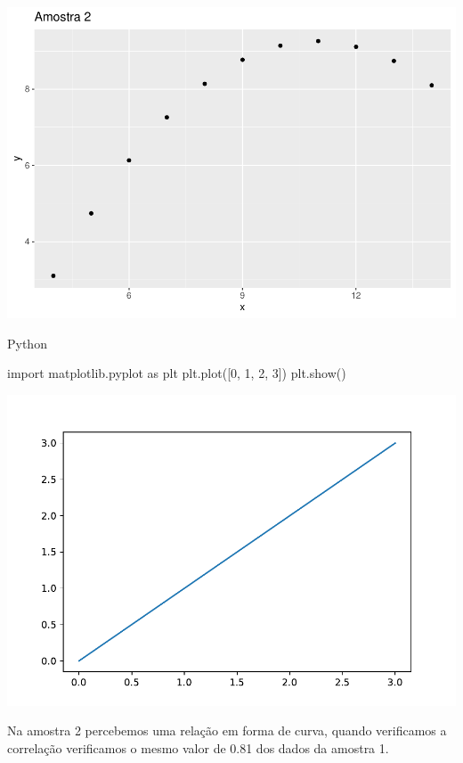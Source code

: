 \documentclass[
]{book}
\newenvironment{Shaded}{\begin{snugshade}}{\end{snugshade}}
\newcommand{\DecValTok}[1]{\textcolor[rgb]{0.00,0.00,0.81}{#1}}
\newcommand{\ImportTok}[1]{#1}
\newcommand{\NormalTok}[1]{#1}
\begin{document}
\includegraphics{_main_files/figure-latex/unnamed-chunk-12-1.pdf}

Python

\begin{Shaded}
\begin{Highlighting}[]
\ImportTok{import}\NormalTok{ matplotlib.pyplot }\ImportTok{as}\NormalTok{ plt}
\NormalTok{plt.plot([}\DecValTok{0}\NormalTok{, }\DecValTok{1}\NormalTok{, }\DecValTok{2}\NormalTok{, }\DecValTok{3}\NormalTok{])}
\NormalTok{plt.show()}
\end{Highlighting}
\end{Shaded}

\includegraphics{_main_files/figure-latex/unnamed-chunk-13-1.pdf}

Na amostra 2 percebemos uma relação em forma de curva, quando verificamos a correlação verificamos o mesmo valor de 0.81 dos dados da amostra 1.

  
\end{document}
